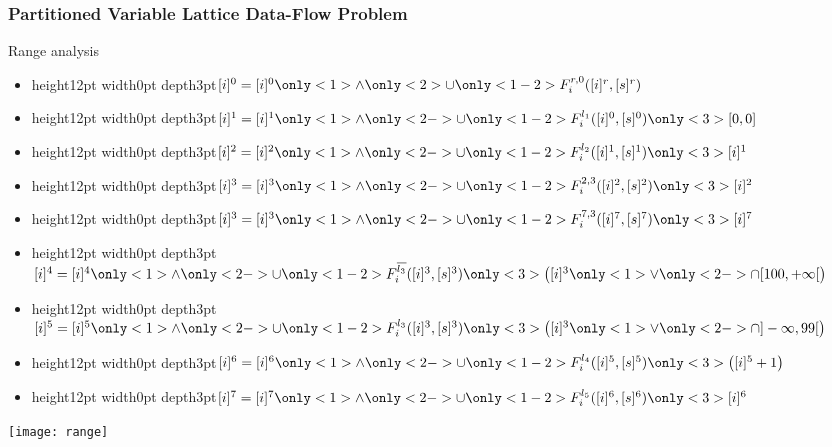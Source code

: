 \begin{frame}
\frametitle{Partitioned Variable Lattice Data-Flow Problem}
\begin{minipage}{0.5\textwidth}
{\def\XXX{\vrule height12pt width0pt depth3pt{}}
  \begin{exampleblock}{Range analysis}
\begin{itemize}
\item \XXX $[i]^0 = [i]^0 \only<1>{\wedge}\only<2>{\cup} \only<1-2>{F^{r,0}_i([i]^r, [s]^r)}$
\item \XXX $[i]^1 = [i]^1 \only<1>{\wedge}\only<2->{\cup} \only<1-2>{F^{l_1}_i([i]^0, [s]^0)}\only<3>{[0,0]}$
\item \XXX $[i]^2 = [i]^2 \only<1>{\wedge}\only<2->{\cup} \only<1-2>{F^{l_2}_i([i]^1, [s]^1)}\only<3>{[i]^1}$
\item \XXX $[i]^3 = [i]^3 \only<1>{\wedge}\only<2->{\cup} \only<1-2>{F^{2,3}_i([i]^2, [s]^2)}\only<3>{[i]^2}$
\item \XXX $[i]^3 = [i]^3 \only<1>{\wedge}\only<2->{\cup} \only<1-2>{F^{7,3}_i([i]^7, [s]^7)}\only<3>{[i]^7}$
\item \XXX $[i]^4 = [i]^4 \only<1>{\wedge}\only<2->{\cup} \only<1-2>{F^{\overline{l_3}}_i([i]^3, [s]^3)}\only<3>{\left([i]^3 \only<1>{\vee}\only<2->{\cap} [100,+\infty[\right)}$
\item \XXX $[i]^5 = [i]^5 \only<1>{\wedge}\only<2->{\cup} \only<1-2>{F^{l_3}_i([i]^3, [s]^3)}\only<3>{\left([i]^3 \only<1>{\vee}\only<2->{\cap} ]-\infty,99[\right)}$
\item \XXX $[i]^6 = [i]^6 \only<1>{\wedge}\only<2->{\cup} \only<1-2>{F^{l_4}_i([i]^5, [s]^5)}\only<3>{\left( [i]^5 + 1\right)}$
\item \XXX $[i]^7 = [i]^7 \only<1>{\wedge}\only<2->{\cup} \only<1-2>{F^{l_5}_i([i]^6, [s]^6)}\only<3>{[i]^6}$
\end{itemize}
\end{exampleblock}}
\end{minipage}%
\hfill
\begin{minipage}{.35\textwidth}
\texttt{[image: range]} 
\end{minipage}
\hfill\strut
\end{frame}

